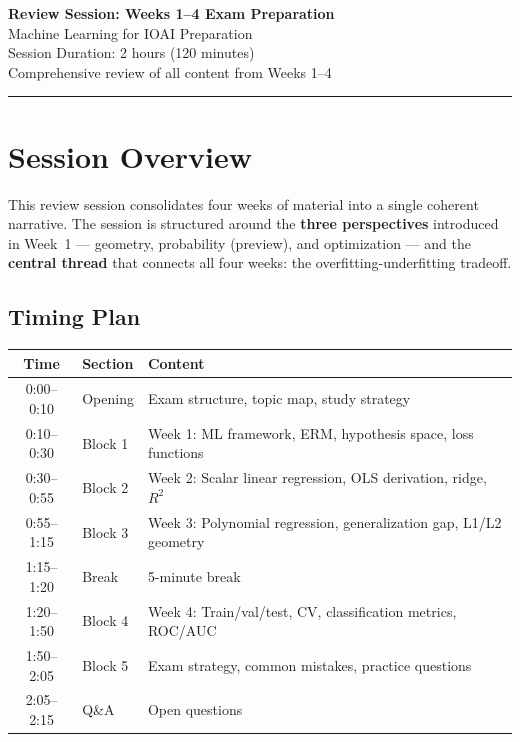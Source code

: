 \documentclass[11pt,a4paper]{article}
\begin{document}
\begin{center}
{\Large\bfseries Review Session: Weeks 1--4 Exam Preparation}\\[4pt]
{\large Machine Learning for IOAI Preparation}\\[4pt]
Session Duration: 2 hours (120 minutes)\\[2pt]
Comprehensive review of all content from Weeks 1--4
\end{center}

\rule{\textwidth}{0.5pt}

\tableofcontents

\bigskip

\section{Session Overview}

This review session consolidates four weeks of material into a single coherent narrative. The session is structured around the \textbf{three perspectives} introduced in Week~1 --- geometry, probability (preview), and optimization --- and the \textbf{central thread} that connects all four weeks: the overfitting-underfitting tradeoff.

\subsection{Timing Plan}

\begin{center}
\begin{tabular}{|c|l|l|}
\hline
\textbf{Time} & \textbf{Section} & \textbf{Content} \\
\hline
0:00--0:10 & Opening & Exam structure, topic map, study strategy \\
\hline
0:10--0:30 & Block 1 & Week 1: ML framework, ERM, hypothesis space, loss functions \\
\hline
0:30--0:55 & Block 2 & Week 2: Scalar linear regression, OLS derivation, ridge, $R^2$ \\
\hline
0:55--1:15 & Block 3 & Week 3: Polynomial regression, generalization gap, L1/L2 geometry \\
\hline
1:15--1:20 & Break & 5-minute break \\
\hline
1:20--1:50 & Block 4 & Week 4: Train/val/test, CV, classification metrics, ROC/AUC \\
\hline
1:50--2:05 & Block 5 & Exam strategy, common mistakes, practice questions \\
\hline
2:05--2:15 & Q\&A & Open questions \\
\hline
\end{tabular}
\end{center}
\end{document}
